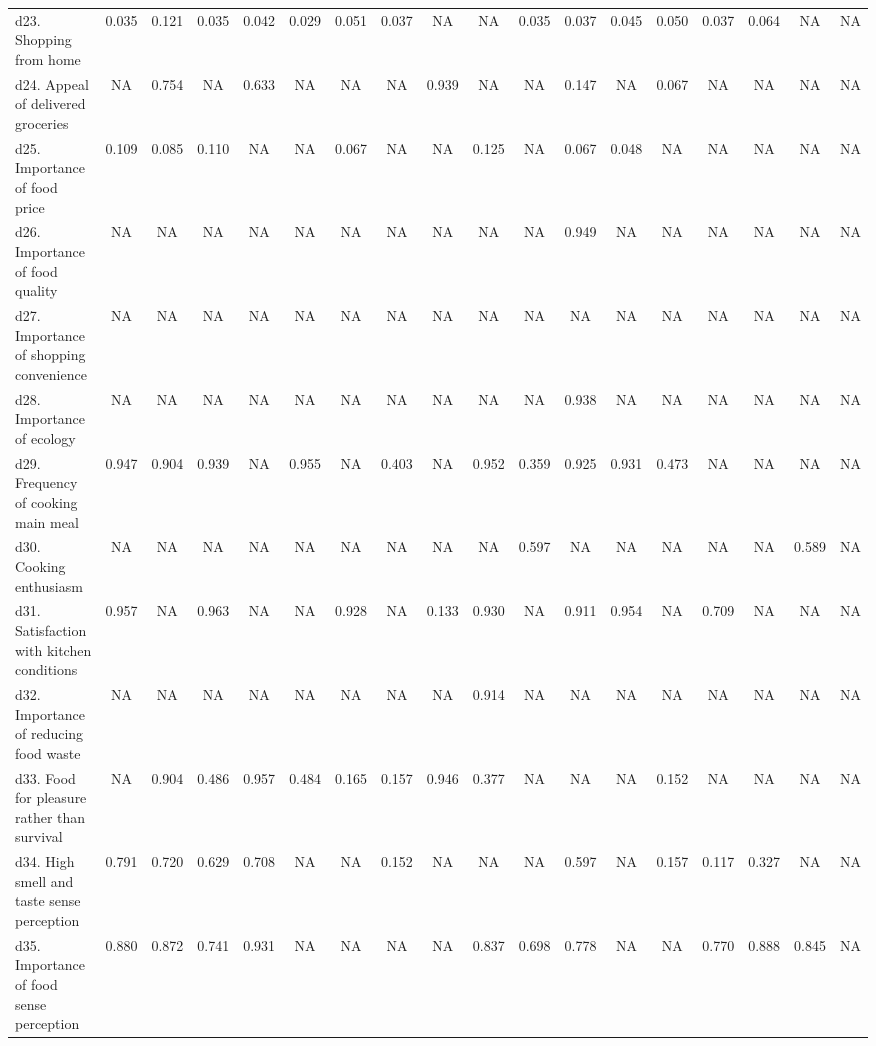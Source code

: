 \begin{table}
\begin{tabulary}{\linewidth}{LCCCCCCCCCCCCCCCCC}
d23. Shopping from home & 0.035 & 0.121 & 0.035 & 0.042 & 0.029 & 0.051 & 0.037 & NA    & NA    & 0.035 & 0.037 & 0.045 & 0.050 & 0.037 & 0.064 & NA    & NA \\
d24. Appeal of delivered groceries & NA    & 0.754 & NA    & 0.633 & NA    & NA    & NA    & 0.939 & NA    & NA    & 0.147 & NA    & 0.067 & NA    & NA    & NA    & NA \\
d25. Importance of food price & 0.109 & 0.085 & 0.110 & NA    & NA    & 0.067 & NA    & NA    & 0.125 & NA    & 0.067 & 0.048 & NA    & NA    & NA    & NA    & NA \\
d26. Importance of food quality & NA    & NA    & NA    & NA    & NA    & NA    & NA    & NA    & NA    & NA    & 0.949 & NA    & NA    & NA    & NA    & NA    & NA \\
d27. Importance of shopping convenience & NA    & NA    & NA    & NA    & NA    & NA    & NA    & NA    & NA    & NA    & NA    & NA    & NA    & NA    & NA    & NA    & NA \\
d28. Importance of ecology & NA    & NA    & NA    & NA    & NA    & NA    & NA    & NA    & NA    & NA    & 0.938 & NA    & NA    & NA    & NA    & NA    & NA \\
d29. Frequency of cooking main meal & 0.947 & 0.904 & 0.939 & NA    & 0.955 & NA    & 0.403 & NA    & 0.952 & 0.359 & 0.925 & 0.931 & 0.473 & NA    & NA    & NA    & NA \\
d30. Cooking enthusiasm & NA    & NA    & NA    & NA    & NA    & NA    & NA    & NA    & NA    & 0.597 & NA    & NA    & NA    & NA    & NA    & 0.589 & NA \\
d31. Satisfaction with kitchen conditions & 0.957 & NA    & 0.963 & NA    & NA    & 0.928 & NA    & 0.133 & 0.930 & NA    & 0.911 & 0.954 & NA    & 0.709 & NA    & NA    & NA \\
d32. Importance of reducing food waste & NA    & NA    & NA    & NA    & NA    & NA    & NA    & NA    & 0.914 & NA    & NA    & NA    & NA    & NA    & NA    & NA    & NA \\
d33. Food for pleasure rather than survival & NA    & 0.904 & 0.486 & 0.957 & 0.484 & 0.165 & 0.157 & 0.946 & 0.377 & NA    & NA    & NA    & 0.152 & NA    & NA    & NA    & NA \\
d34. High smell and taste sense perception & 0.791 & 0.720 & 0.629 & 0.708 & NA    & NA    & 0.152 & NA    & NA    & NA    & 0.597 & NA    & 0.157 & 0.117 & 0.327 & NA    & NA \\
d35. Importance of food sense perception & 0.880 & 0.872 & 0.741 & 0.931 & NA    & NA    & NA    & NA    & 0.837 & 0.698 & 0.778 & NA    & NA    & 0.770 & 0.888 & 0.845 & NA \\

\end{tabulary}
\end{table}
